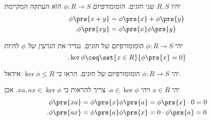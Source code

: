 \documentclass[a4paper,10pt,oneside,openany]{article}
\begin{document}
\begin{definition}
יהיו
$R,S$
שני חוגים.
\emph{הומומורפיזם}
$\phi \colon R \to S$
הוא העתקה המקיימת
\begin{align*}
\phi\prs{x+y} &= \phi\prs{x} + \phi\prs{y} \\
\text{.} \phi\prs{xy} &= \phi\prs{x}\phi\prs{y}
\end{align*}
\end{definition}

\begin{definition}[גרעין]
יהי
$\phi \colon R \to S$
הומומורפיזם של חוגים.
נגדיר את
\emph{הגרעין של
$\phi$}
להיות
\[\text{.} \ker\phi \ceq \set{x \in R}{\phi\prs{x} = 0}\]
\end{definition}

\begin{exercise}
יהי
$\phi \colon R \to S$
הומומורפיזם של חוגים.
הראו כי
$\ker \phi \leq R$
אידאל.
\end{exercise}

\begin{solution}
יהי
$x \in R$
ויהי
$a \in \ker \phi$.
צריך להראות כי
$xa,ax \in \ker \phi$.
אכן
\begin{align*}
\phi\prs{xa} &= \phi\prs{x}\phi\prs{a} = \phi\prs{x} \cdot 0 = 0 \\
\text{.} \phi\prs{ax} &= \phi\prs{a} \phi\prs{x} = 0 \cdot \phi\prs{a} = 0
\end{align*}
\end{solution}
\end{document}
